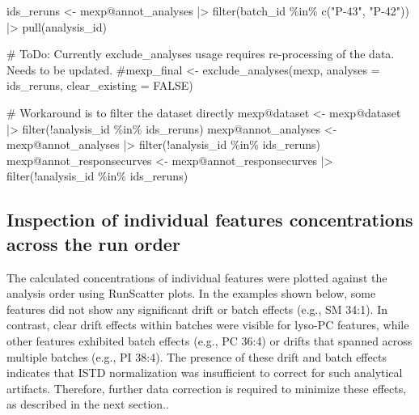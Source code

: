 \documentclass[
  letterpaper,
  DIV=11,
  numbers=noendperiod]{scrartcl}
\newenvironment{Shaded}{\begin{snugshade}}{\end{snugshade}}
\newcommand{\CommentTok}[1]{\textcolor[rgb]{0.37,0.37,0.37}{#1}}
\newcommand{\FunctionTok}[1]{\textcolor[rgb]{0.28,0.35,0.67}{#1}}
\newcommand{\NormalTok}[1]{\textcolor[rgb]{0.00,0.23,0.31}{#1}}
\newcommand{\OtherTok}[1]{\textcolor[rgb]{0.00,0.23,0.31}{#1}}
\newcommand{\SpecialCharTok}[1]{\textcolor[rgb]{0.37,0.37,0.37}{#1}}
\newcommand{\StringTok}[1]{\textcolor[rgb]{0.13,0.47,0.30}{#1}}
\begin{document}
\begin{Shaded}
\begin{Highlighting}[]
\NormalTok{ids\_reruns }\OtherTok{\textless{}{-}}\NormalTok{ mexp}\SpecialCharTok{@}\NormalTok{annot\_analyses }\SpecialCharTok{|\textgreater{}} \FunctionTok{filter}\NormalTok{(batch\_id }\SpecialCharTok{\%in\%} \FunctionTok{c}\NormalTok{(}\StringTok{"P{-}43"}\NormalTok{, }\StringTok{"P{-}42"}\NormalTok{)) }\SpecialCharTok{|\textgreater{}} \FunctionTok{pull}\NormalTok{(analysis\_id)}

\CommentTok{\# ToDo: Currently exclude\_analyses usage requires re{-}processing of the data. Needs to be updated.}
\CommentTok{\#mexp\_final \textless{}{-} exclude\_analyses(mexp, analyses = ids\_reruns, clear\_existing = FALSE)}

\CommentTok{\# Workaround is to filter the dataset directly}
\NormalTok{mexp}\SpecialCharTok{@}\NormalTok{dataset }\OtherTok{\textless{}{-}}\NormalTok{ mexp}\SpecialCharTok{@}\NormalTok{dataset }\SpecialCharTok{|\textgreater{}} \FunctionTok{filter}\NormalTok{(}\SpecialCharTok{!}\NormalTok{analysis\_id }\SpecialCharTok{\%in\%}\NormalTok{ ids\_reruns)}
\NormalTok{mexp}\SpecialCharTok{@}\NormalTok{annot\_analyses }\OtherTok{\textless{}{-}}\NormalTok{ mexp}\SpecialCharTok{@}\NormalTok{annot\_analyses }\SpecialCharTok{|\textgreater{}} \FunctionTok{filter}\NormalTok{(}\SpecialCharTok{!}\NormalTok{analysis\_id }\SpecialCharTok{\%in\%}\NormalTok{ ids\_reruns)}
\NormalTok{mexp}\SpecialCharTok{@}\NormalTok{annot\_responsecurves }\OtherTok{\textless{}{-}}\NormalTok{ mexp}\SpecialCharTok{@}\NormalTok{annot\_responsecurves }\SpecialCharTok{|\textgreater{}} \FunctionTok{filter}\NormalTok{(}\SpecialCharTok{!}\NormalTok{analysis\_id }\SpecialCharTok{\%in\%}\NormalTok{ ids\_reruns)}
\end{Highlighting}
\end{Shaded}

\subsection{Inspection of individual features concentrations across the
run
order}\label{inspection-of-individual-features-concentrations-across-the-run-order}

The calculated concentrations of individual features were plotted
against the analysis order using RunScatter plots. In the examples shown
below, some features did not show any significant drift or batch effects
(e.g., SM 34:1). In contrast, clear drift effects within batches were
visible for lyso-PC features, while other features exhibited batch
effects (e.g., PC 36:4) or drifts that spanned across multiple batches
(e.g., PI 38:4). The presence of these drift and batch effects indicates
that ISTD normalization was insufficient to correct for such analytical
artifacts. Therefore, further data correction is required to minimize
these effects, as described in the next section..
\end{document}
